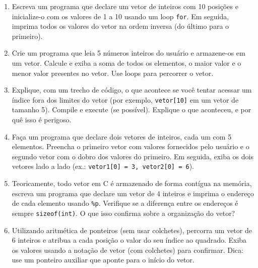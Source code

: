 \begin{enumerate}
    \item {Escreva um programa que declare um vetor de inteiros com 10 posições 
        e inicialize-o com os valores de 1 a 10 usando um loop \texttt{for}. Em 
        seguida, imprima todos os valores do vetor na ordem inversa (do último 
        para o primeiro).}
    \item {Crie um programa que leia 5 números inteiros do usuário e armazene-os 
        em um vetor. Calcule e exiba a soma de todos os elementos, o maior valor 
        e o menor valor presentes no vetor. Use loops para percorrer o vetor.}
    \item {Explique, com um trecho de código, o que acontece se você tentar 
        acessar um índice fora dos limites do vetor (por exemplo, 
        \texttt{vetor[10]} em um vetor de tamanho 5). Compile e execute (se 
        possível). Explique o que aconteceu, e por quê isso é perigoso.}
    \item {Faça um programa que declare dois vetores de inteiros, cada um com 5 
        elementos. Preencha o primeiro vetor com valores fornecidos pelo usuário 
        e o segundo vetor com o dobro dos valores do primeiro. Em seguida, exiba 
        os dois vetores lado a lado (ex.: \texttt{vetor1[0] = 3, vetor2[0] = 6}).}
    \item {Teoricamente, todo vetor em C é armazenado de forma contígua na 
        memória, escreva um programa que declare um vetor de 4 inteiros e imprima 
        o endereço de cada elemento usando \texttt{\%p}. Verifique se a 
        diferença entre os endereços é sempre \texttt{sizeof(int)}. O que isso 
        confirma sobre a organização do vetor?}
    \item {Utilizando aritmética de ponteiros (sem usar colchetes), percorra um 
        vetor de 6 inteiros e atribua a cada posição o valor do seu índice ao 
        quadrado. Exiba os valores usando a notação de vetor (com colchetes) 
        para confirmar. Dica: use um ponteiro auxiliar que aponte para o início 
        do vetor.}
\end{enumerate}
